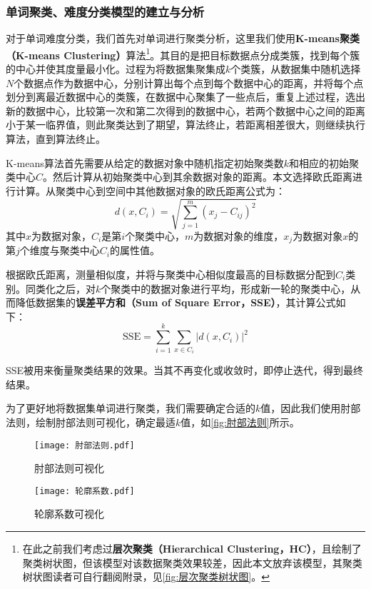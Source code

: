 \documentclass{MathModeling}
\begin{document}
	\subsubsection{单词聚类、难度分类模型的建立与分析}
	对于单词难度分类，我们首先对单词进行聚类分析，这里我们使用\textbf{K-means聚类（K-means Clustering）}算法\textcolor{blue}{\footnote{在此之前我们考虑过\textbf{层次聚类（Hierarchical Clustering，HC）}，且绘制了聚类树状图，但该模型对该数据聚类效果较差，因此本文放弃该模型，其聚类树状图读者可自行翻阅附录，见\textcolor{blue}{\cref{fig:层次聚类树状图}}。}}。其目的是把目标数据点分成类簇，找到每个簇的中心并使其度量最小化。过程为将数据集聚集成$k$个类簇，从数据集中随机选择$N$个数据点作为数据中心，分别计算出每个点到每个数据中心的距离，并将每个点划分到离最近数据中心的类簇，在数据中心聚集了一些点后，重复上述过程，选出新的数据中心，比较第一次和第二次得到的数据中心，若两个数据中心之间的距离小于某一临界值，则此聚类达到了期望，算法终止，若距离相差很大，则继续执行算法，直到算法终止。
	
	K-means算法首先需要从给定的数据对象中随机指定初始聚类数$k$和相应的初始聚类中心$C$。然后计算从初始聚类中心到其余数据对象的距离。本文选择欧氏距离进行计算。从聚类中心到空间中其他数据对象的欧氏距离公式为：
	\begin{equation}
		d\left(x,C_i\right)=\sqrt{\sum_{j=1}^{m}(x_{j}-C_{ij})^2}
	\end{equation}
	其中$x$为数据对象，$C_i$是第$i$个聚类中心，$m$为数据对象的维度，$x_j$为数据对象$x$的第$j$个维度与聚类中心$C_i$的属性值。

	根据欧氏距离，测量相似度，并将与聚类中心相似度最高的目标数据分配到$C_i$类别。同类化之后，对$k$个聚类中的数据对象进行平均，形成新一轮的聚类中心，从而降低数据集的\textbf{误差平方和（Sum of Square Error，SSE）}，其计算公式如下：
	\begin{equation}
		\text{SSE}=\sum_{i=1}^{k}\sum_{x\in C_i}\left|d\left(x,C_i\right)\right|^2
	\end{equation}

	SSE被用来衡量聚类结果的效果。当其不再变化或收敛时，即停止迭代，得到最终结果。

	为了更好地将数据集单词进行聚类，我们需要确定合适的$k$值，因此我们使用肘部法则，绘制肘部法则可视化，确定最适$k$值，如\textcolor{blue}{\cref{fig:肘部法则}}所示。

	\begin{figure}[H]
		\centering
		\begin{minipage}{0.48\linewidth}
			\centering
			\texttt{[image: 肘部法则.pdf]}
			\caption{肘部法则可视化}
			\label{fig:肘部法则}
		\end{minipage}
		\begin{minipage}{0.48\linewidth}
			\centering
			\texttt{[image: 轮廓系数.pdf]}
			\caption{轮廓系数可视化}
			\label{fig:轮廓系数}
		\end{minipage}
	\end{figure}
\end{document}
